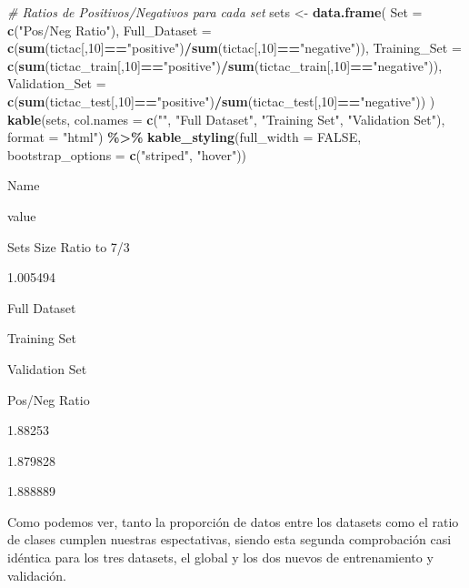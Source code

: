 \documentclass[
]{article}
\newenvironment{Shaded}{\begin{snugshade}}{\end{snugshade}}
\newcommand{\AttributeTok}[1]{\textcolor[rgb]{0.13,0.29,0.53}{#1}}
\newcommand{\CommentTok}[1]{\textcolor[rgb]{0.56,0.35,0.01}{\textit{#1}}}
\newcommand{\ConstantTok}[1]{\textcolor[rgb]{0.56,0.35,0.01}{#1}}
\newcommand{\DecValTok}[1]{\textcolor[rgb]{0.00,0.00,0.81}{#1}}
\newcommand{\FunctionTok}[1]{\textcolor[rgb]{0.13,0.29,0.53}{\textbf{#1}}}
\newcommand{\NormalTok}[1]{#1}
\newcommand{\OtherTok}[1]{\textcolor[rgb]{0.56,0.35,0.01}{#1}}
\newcommand{\SpecialCharTok}[1]{\textcolor[rgb]{0.81,0.36,0.00}{\textbf{#1}}}
\newcommand{\StringTok}[1]{\textcolor[rgb]{0.31,0.60,0.02}{#1}}
\begin{document}
\begin{Shaded}
\begin{Highlighting}[]
\CommentTok{\# Ratios de Positivos/Negativos para cada set}
\NormalTok{sets }\OtherTok{\textless{}{-}} \FunctionTok{data.frame}\NormalTok{(}
  \AttributeTok{Set =} \FunctionTok{c}\NormalTok{(}\StringTok{"Pos/Neg Ratio"}\NormalTok{),}
  \AttributeTok{Full\_Dataset =} \FunctionTok{c}\NormalTok{(}\FunctionTok{sum}\NormalTok{(tictac[,}\DecValTok{10}\NormalTok{]}\SpecialCharTok{==}\StringTok{"positive"}\NormalTok{)}\SpecialCharTok{/}\FunctionTok{sum}\NormalTok{(tictac[,}\DecValTok{10}\NormalTok{]}\SpecialCharTok{==}\StringTok{"negative"}\NormalTok{)),}
  \AttributeTok{Training\_Set =} \FunctionTok{c}\NormalTok{(}\FunctionTok{sum}\NormalTok{(tictac\_train[,}\DecValTok{10}\NormalTok{]}\SpecialCharTok{==}\StringTok{"positive"}\NormalTok{)}\SpecialCharTok{/}\FunctionTok{sum}\NormalTok{(tictac\_train[,}\DecValTok{10}\NormalTok{]}\SpecialCharTok{==}\StringTok{"negative"}\NormalTok{)),}
  \AttributeTok{Validation\_Set =} \FunctionTok{c}\NormalTok{(}\FunctionTok{sum}\NormalTok{(tictac\_test[,}\DecValTok{10}\NormalTok{]}\SpecialCharTok{==}\StringTok{"positive"}\NormalTok{)}\SpecialCharTok{/}\FunctionTok{sum}\NormalTok{(tictac\_test[,}\DecValTok{10}\NormalTok{]}\SpecialCharTok{==}\StringTok{"negative"}\NormalTok{))}
\NormalTok{)}
\FunctionTok{kable}\NormalTok{(sets, }\AttributeTok{col.names =} \FunctionTok{c}\NormalTok{(}\StringTok{""}\NormalTok{, }\StringTok{"Full Dataset"}\NormalTok{, }\StringTok{"Training Set"}\NormalTok{, }\StringTok{"Validation Set"}\NormalTok{), }\AttributeTok{format =} \StringTok{"html"}\NormalTok{) }\SpecialCharTok{\%\textgreater{}\%}
  \FunctionTok{kable\_styling}\NormalTok{(}\AttributeTok{full\_width =} \ConstantTok{FALSE}\NormalTok{, }\AttributeTok{bootstrap\_options =} \FunctionTok{c}\NormalTok{(}\StringTok{"striped"}\NormalTok{, }\StringTok{"hover"}\NormalTok{))}
\end{Highlighting}
\end{Shaded}

Name

value

Sets Size Ratio to 7/3

1.005494

Full Dataset

Training Set

Validation Set

Pos/Neg Ratio

1.88253

1.879828

1.888889

Como podemos ver, tanto la proporción de datos entre los datasets como
el ratio de clases cumplen nuestras espectativas, siendo esta segunda
comprobación casi idéntica para los tres datasets, el global y los dos
nuevos de entrenamiento y validación.
\end{document}
